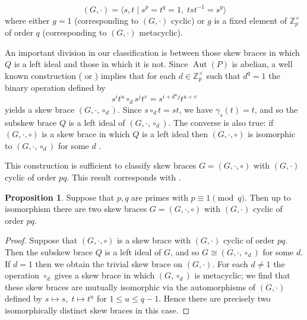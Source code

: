 \documentclass[12pt,a4paper, reqno]{amsart}
\theoremstyle{definition}
\newtheorem{proposition}[theorem]{Proposition}
\newcommand{\Z}{\mathbb{Z}}
\DeclareMathOperator{\Aut}{\mbox{Aut}}
\begin{document}
\begin{equation} \label{eqn_additive_presentaion}
(G,\cdot) = \langle s,t \mid s^{p} = t^{q} = 1, \; tst^{-1} = s^{g} \rangle
\end{equation}
where either $ g=1 $ (corresponding to $ (G,\cdot) $ cyclic) or $ g $ is a fixed element of $ \Z_{p}^{\times} $ of order $ q $ (corresponding to $ (G,\cdot) $ metacyclic). 

An important division in our classification is between those skew braces in which $ Q $ is a left ideal and those in which it is not. Since $ \Aut(P) $ is abelian, a well known construction (\cite[Proposition 4.6.12]{NZ18} or \cite[Proposition 1.1]{AcB20}) implies that for each $ d \in \Z_{p}^{\times} $ such that $ d^{q}=1 $ the binary operation defined by 
\begin{equation} \label{eqn_sdp_skew_brace}
s^{i}t^{u} \circ_{d} s^{j}t^{v} = s^{i+d^{u}j}t^{u+v} 
\end{equation}
yields a skew brace $ (G,\cdot,\circ_{d}) $. Since $ s \circ_{d} t = st $, we have $ \gamma_{s}(t)=t $, and so the subskew brace $ Q $ is a left ideal of $ (G,\cdot,\circ_{d}) $. The converse is also true: if  $ (G,\cdot,\circ) $ is a skew brace in which $ Q $ is a left ideal then $ (G,\cdot,\circ) $ is isomorphic to $ (G,\cdot,\circ_{d}) $ for some $ d $ \cite[Proposition 3.3]{Tr26}. 

This construction is sufficient to classify skew braces $ G=(G,\cdot,\circ) $ with $ (G,\cdot) $ cyclic of order $ pq $. This result corresponds with \cite[Main Theorem, first bullet point]{AcB20}.

\begin{proposition} \label{prop_classify_pq_cyclic}
Suppose that $ p,q $ are primes with $ p \equiv 1 \pmod{q} $. Then up to isomorphism there are two skew braces $ G=(G,\cdot,\circ) $ with $ (G,\cdot) $ cyclic of order $ pq $. 
\end{proposition}
\begin{proof}
Suppose that $ (G,\cdot,\circ) $ is a skew brace with $ (G,\cdot) $ cyclic of order $ pq $. Then the subskew brace $ Q $ is a left ideal of $ G $, and so $ G \cong (G,\cdot,\circ_{d}) $ for some $ d $. If $ d=1 $ then we obtain the trivial skew brace on $ (G,\cdot) $. For each $ d \neq 1 $ the operation $ \circ_{d} $ gives a skew brace in which $ (G,\circ_{d}) $ is metacyclic; we find that these skew braces are mutually isomorphic via the automorphisms of $ (G,\cdot) $ defined by $ s \mapsto s, \; t \mapsto t^{u} $ for $ 1 \leq u \leq q-1 $. Hence there are precisely two isomorphically distinct skew braces in this case. 
\end{proof}
\end{document}
